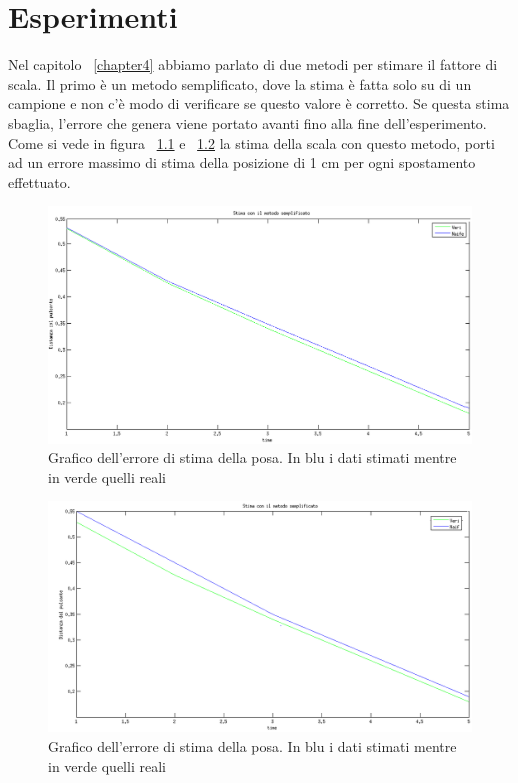 \chapter{Esperimenti}
\label{chapter5}
Nel capitolo ~\ref{chapter4} abbiamo parlato di due metodi per stimare il fattore di scala. Il primo è un metodo semplificato, dove la stima è fatta solo su di un campione e non c'è modo di verificare se questo valore è corretto. Se questa stima sbaglia, l'errore che genera viene portato avanti fino alla fine dell'esperimento. Come si vede in figura ~\ref{fig:1_metodo1} e ~\ref{fig:1_metodo2} la stima della scala con questo metodo, porti ad un errore massimo di stima della posizione di 1 cm per ogni spostamento effettuato.
\begin{figure}[H]
   \centering
   \includegraphics[width=1.\columnwidth]{naif25.png}
   \caption{Grafico dell'errore di stima della posa. In blu i dati stimati mentre in verde quelli reali}
   \label{fig:1_metodo1} 
\end{figure} 
\begin{figure}[H]
   \centering
   \includegraphics[width=1.\columnwidth]{naif28.png}
   \caption{Grafico dell'errore di stima della posa. In blu i dati stimati mentre in verde quelli reali}
   \label{fig:1_metodo2} 
\end{figure} 


